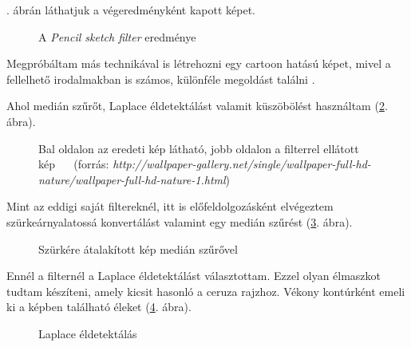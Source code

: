 . ábrán láthatjuk a végeredményként kapott képet.

\begin{figure}[h!]
\centering
{}
\caption{A \textit{Pencil sketch filter} eredménye} 
\label{fig:pencil7}
\end{figure}


Megpróbáltam más technikával is létrehozni egy cartoon hatású képet, mivel a fellelhető irodalmakban is számos, különféle megoldást találni \cite{emami}.

Ahol medián szűrőt, Laplace éldetektálást valamit küszöbölést használtam (\ref{fig:2_cartoon1}. ábra).

\begin{figure}[h!]
\centering
{}
\caption{Bal oldalon az eredeti kép látható, jobb oldalon a filterrel ellátott kép $\quad$ (forrás: \textit{http://wallpaper-gallery.net/single/wallpaper-full-hd-nature/wallpaper-full-hd-nature-1.html})} 
\label{fig:2_cartoon1}
\end{figure}


Mint az eddigi saját filtereknél, itt is előfeldolgozásként elvégeztem szürkeárnyalatossá konvertálást valamint egy medián szűrést (\ref{fig:2_cartoon2}. ábra).

\begin{figure}[h!]
\centering
{}
\caption{Szürkére átalakított kép medián szűrővel} 
\label{fig:2_cartoon2}
\end{figure}


Ennél a filternél a Laplace éldetektálást választottam. Ezzel olyan élmaszkot tudtam készíteni, amely kicsit hasonló a ceruza rajzhoz. Vékony kontúrként emeli ki a képben található éleket (\ref{fig:2_cartoon3}. ábra).


\begin{figure}[h!]
\centering
{}
\caption{Laplace éldetektálás} 
\label{fig:2_cartoon3}
\end{figure}


